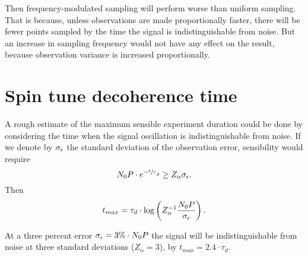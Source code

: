 \documentclass{article}
\begin{document}
Then frequency-modulated sampling will perform worse than uniform sampling. That is because, unless observations are made proportionally faster, there will be fewer points sampled by the time the signal is indistinguishable from noise. But an increase in sampling frequency would not have any effect on the result, because observation variance is increased proportionally.

\section{Spin tune decoherence time}

A rough estimate of the maximum sensible experiment duration could be done by considering the time when the signal oscillation is indistinguishable from noise. If we denote by $\SD{\obs}$ the standard deviation of the observation error, sensibility would require
\[
	N_0P\cdot e^{-\sfrac t\tau_d} \geq Z_\alpha \SD{\obs}.
\]
Then 
\[
	t_{max} = \tau_d\cdot \log\bkt{Z_\alpha^{-1}\frac{N_0P}{\SD{\obs}}}.
\]

At a three percent error $\SD{\obs} = 3\%\cdot N_0P$ the signal will be indistinguishable from noise at three standard deviations ($Z_\alpha = 3$), by $t_{max} = 2.4\cdot \tau_d$. 

%
\end{document}
